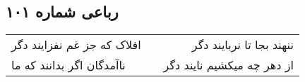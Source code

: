 \begin{center}
\section*{رباعی شماره ۱۰۱}
\label{sec:sh101}
\begin{longtable}{l p{0.5cm} r}
افلاک که جز غم نفزایند دگر
&&
ننهند بجا تا نربایند دگر
\\
ناآمدگان اگر بدانند که ما
&&
از دهر چه میکشیم نایند دگر
\\
\end{longtable}
\end{center}
